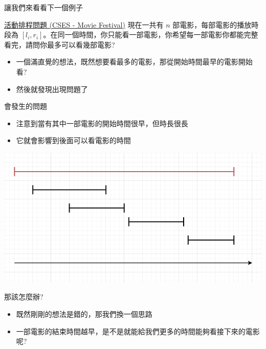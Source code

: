 \documentclass[aspectratio=169]{beamer}
\begin{document}
    \begin{frame}{讓我們來看看下一個例子}
        \begin{block}{\href{https://cses.fi/problemset/task/1629}{活動排程問題 (CSES - Movie Festival)}}
            現在一共有 $n$ 部電影，每部電影的播放時段為 $[l_i, r_i]$。在同一個時間，你只能看一部電影，你希望每一部電影你都能完整看完，請問你最多可以看幾部電影?
        \end{block}
        \begin{itemize}
            \item<2-> 一個滿直覺的想法，既然想要看最多的電影，那從開始時間最早的電影開始看?
            \item<2-> 然後就發現出現問題了
        \end{itemize}
    \end{frame}
    
    \begin{frame}{會發生的問題}
        \begin{itemize}
            \item 注意到當有其中一部電影的開始時間很早，但時長很長
            \item 它就會影響到後面可以看電影的時間
        \end{itemize}
        \begin{center}
            \includegraphics[scale=0.5]{images/movie_festival.png}
        \end{center}
    \end{frame}
    
    \begin{frame}{那該怎麼辦?}
        \begin{itemize}
            \item 既然剛剛的想法是錯的，那我們換一個思路
            \item 一部電影的結束時間越早，是不是就能給我們更多的時間能夠看接下來的電影呢?
        \end{itemize}
    \end{frame}
    
\end{document}

